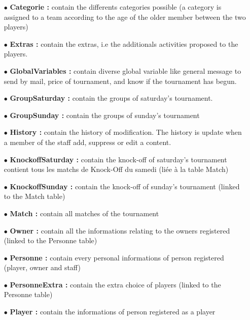 \documentclass{article}
\begin{document}
\begin{itemize}
\item[$\bullet$]{\textbf{Categorie :}} contain the differents categories possible (a category is assigned to a team according to the age of the older member between the two players)

\item[$\bullet$]{\textbf{Extras :}} contain the extras, i.e the additionals activities proposed to the players.

\item[$\bullet$]{\textbf{GlobalVariables :}} contain diverse global variable like general message to send by mail, price of tournament, and know if the tournament has begun.

\item[$\bullet$]{\textbf{GroupSaturday :}} contain the groups of saturday's tournament.

\item[$\bullet$]{\textbf{GroupSunday :}} contain the groups of sunday's tournament

\item[$\bullet$]{\textbf{History  :}}  contain the history of modification. The history is update when a member of the staff add, suppress or edit a content.

\item[$\bullet$]{\textbf{KnockoffSaturday :}} contain the knock-off of saturday's tournament
contient tous les matchs de Knock-Off du samedi (liée à la table Match)

\item[$\bullet$]{\textbf{KnockoffSunday  :}}  contain the knock-off of sunday's tournament  (linked to the Match table)

\item[$\bullet$]{\textbf{Match :}} contain all matches of the tournament

\item[$\bullet$]{\textbf{Owner :}} contain all the informations relating to the owners registered (linked to the Personne table)

\item[$\bullet$]{\textbf{Personne  :}}  contain every personal informations of person registered (player, owner and staff)

\item[$\bullet$]{\textbf{PersonneExtra :}} contain the extra choice of players (linked to the Personne table)

\item[$\bullet$]{\textbf{Player :}} contain the informations of person registered as a player


\end{itemize}
\end{document}
